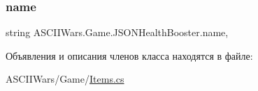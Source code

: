 \subsubsection{\texorpdfstring{name}{name}}
{\footnotesize\ttfamily string A\+S\+C\+I\+I\+Wars.\+Game.\+J\+S\+O\+N\+Health\+Booster.\+name\hspace{0.3cm}{\ttfamily [get]}, {\ttfamily [set]}}



Объявления и описания членов класса находятся в файле\+:\begin{DoxyCompactItemize}
\item 
A\+S\+C\+I\+I\+Wars/\+Game/\hyperlink{_items_8cs}{Items.\+cs}\end{DoxyCompactItemize}
